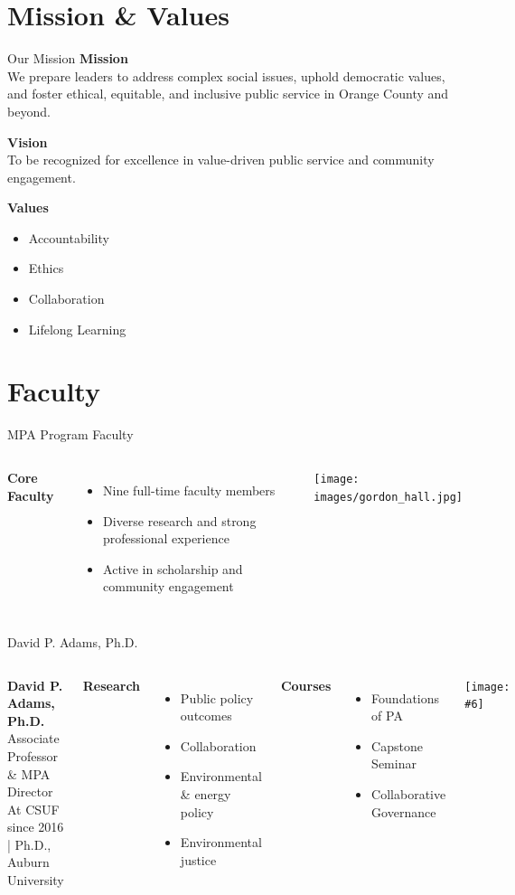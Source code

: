 \documentclass[10pt]{beamer}
\newcommand{\FacultyProfile}[6]{%
\begin{frame}{#1}
  \begin{columns}[T,onlytextwidth]
    \column{0.66\textwidth}
      \textbf{#1}\\[2pt]
      #2\\[3pt]
      {\footnotesize #3}
      \vspace{0.5em}

      \textbf{Research}
      \begin{itemize}
        #4
      \end{itemize}

      \textbf{Courses}
      \begin{itemize}
        #5
      \end{itemize}

    \column{0.34\textwidth}
      \vspace*{0.25cm}
      \texttt{[image: \#6]}
  \end{columns}
\end{frame}
}
\begin{document}
\section{Mission \& Values}
\begin{frame}{Our Mission}
\textbf{Mission}\\
We prepare leaders to address complex social issues, uphold democratic values, and foster ethical, equitable, and inclusive public service in Orange County and beyond.

\vspace{0.8em}
\textbf{Vision}\\
To be recognized for excellence in value-driven public service and community engagement.

\vspace{0.8em}
\textbf{Values}
\begin{itemize}
  \item Accountability \quad \item Ethics \quad \item Collaboration \quad \item Lifelong Learning
\end{itemize}
\end{frame}

\section{Faculty}
\begin{frame}{MPA Program Faculty}
\begin{columns}[T,onlytextwidth]
  \textbf{Core Faculty}
  \begin{itemize}
    \item Nine full-time faculty members
    \item Diverse research and strong professional experience
    \item Active in scholarship and community engagement
  \end{itemize}
  \texttt{[image: images/gordon\_hall.jpg]}
\end{columns}
\end{frame}

\FacultyProfile
  {David P. Adams, Ph.D.}
  {Associate Professor \& MPA Director}
  {At CSUF since 2016 \quad | \quad Ph.D., Auburn University}
  {\item Public policy outcomes
   \item Collaboration
   \item Environmental \& energy policy
   \item Environmental justice}
  {\item Foundations of PA
   \item Capstone Seminar
   \item Collaborative Governance}
  {images/adams.jpg}
\end{document}
